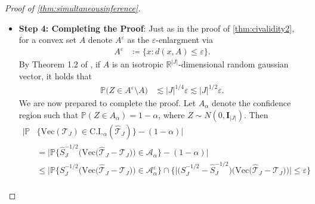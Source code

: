 \documentclass[10pt]{article}
\newcommand{\0}{{\mathbf{0}}}
\newcommand{\1}{{\mathbf{1}}}
\renewcommand{\citet}{\cite}
\newcommand{\eps}{\varepsilon}
\newcommand{\p}{\mathbb{P}}
\renewcommand{\hat}{\widehat}
\renewcommand{\hat}{\widehat}
\begin{document}
\begin{proof}[Proof of \cref{thm:simultaneousinference}]
\begin{itemize}
\begin{align*}
    \| \bigg( S_{J}^{-1/2} - \hat S_{J}^{-1/2} \bigg) (\mathcal{\hat T}_J - \mathcal{T}_J ) \| &\leq |J | \| \mathcal{\hat T} - \mathcal{T} \|_{\max} \| S_{J}^{-1/2} - \hat S_{J}^{-1/2} \| \\
    &\leq |J| \| S_{J}^{-1/2} ( \hat S_{J}^{1/2} - S_{J}^{1/2}) \hat S_{J}^{-1/2} \| \| \mathcal{\hat T} - \mathcal{T} \|_{\max} \\
    &\lesssim |J| \| \mathcal{\hat T} - \mathcal{T} \|_{\max} \frac{1}{s_{\min}^2} \| \hat S_J^{1/2} - S_J^{1/2} \| \\
    &\lesssim |J| \| \mathcal{\hat T} - \mathcal{T} \|_{\max} \frac{1}{s_{\min}^3} M \\
    &\lesssim  \frac{|J| M }{s_{\min}^3} \bigg( \frac{\sigma \kappa \mu_{0} \sqrt{r \log (p)}}{p}+\frac{\sigma^{2} \mu_{0}^{4} \kappa^{3} r^{3} \log (p)}{\lambda \sqrt{p}} \bigg) \\
    &=: \eps,
\end{align*}
where we note that the final inequality holds with probability at least $1 - O(p^{-6})$ by \cref{cor:maxnormbound}.  
\item 
\textbf{Step 4: Completing the Proof}: Just as in the proof of \cref{thm:civalidity2}, for a convex set $A$ denote $A^{\eps}$ as the $\eps$-enlargment via
\begin{align*}
    A^{\eps} &\coloneqq \{x : d(x,A) \leq \eps \}.
\end{align*}
By Theorem 1.2 of \citet{raicv_multivariate_2019}, if $A$ is an isotropic $\mathbb{R}^{|J|}$-dimensional random gaussian vector, it holds that
\begin{align*}
    \p\bigg( Z \in A^{\eps}\setminus A\bigg) &\lesssim |J|^{1/4} \eps \lesssim |J|^{1/2} \eps.
\end{align*}
We are now prepared to complete the proof.  Let $A_{\alpha}$ denote the confidence region such that $\p(Z \in A_{\alpha}) = 1 - \alpha$, where $Z \sim N(0, \mathbf{I}_{|J|})$.  Then
\begin{align*}
    \bigg|\p&\bigg\{  \mathrm{Vec}(\mathcal{T}_J) \in \mathrm{C.I.}_{\alpha}(\mathcal{\hat T}_J) \bigg\} - (1 - \alpha) \bigg| \\
    &= \bigg| \p\bigg\{ \hat S_{J}^{-1/2}\bigg( \mathrm{Vec}\big( \mathcal{\hat T}_J - \mathcal{T}_J \big) \bigg) \in \mathcal{A}_{\alpha} \bigg\} - (1 - \alpha) \bigg| \\
    &\leq \bigg| \p\bigg\{ S_{J}^{-1/2} \bigg( \mathrm{Vec}\big( \mathcal{\hat T}_J - \mathcal{T}_J \big) \bigg) \in \mathcal{A}_{\alpha}^{\eps} \bigg\} \cap \bigg\{\bigg|\big( S_{J}^{-1/2} - \hat S_{J}^{-1/2}\big) \bigg( \mathrm{Vec}\big( \mathcal{\hat T}_J - \mathcal{T}_J \big) \bigg)\bigg| \leq \eps \bigg\} \\

\end{align*}
\end{itemize}
\end{proof}
\end{document}

